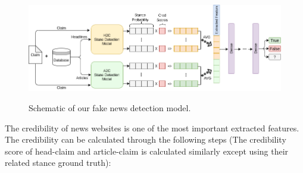 \begin{figure}%
	\centering
	{\includegraphics[width=14.5cm]{statistics/schema/fn.png} }
	\caption{Schematic of our fake news detection model.}%
	\label{fig:fnschm}%
\end{figure}

The credibility of news websites is one of the most important extracted features. The credibility can be calculated through the following steps (The credibility score of head-claim and article-claim is calculated similarly except using their related stance ground truth):


